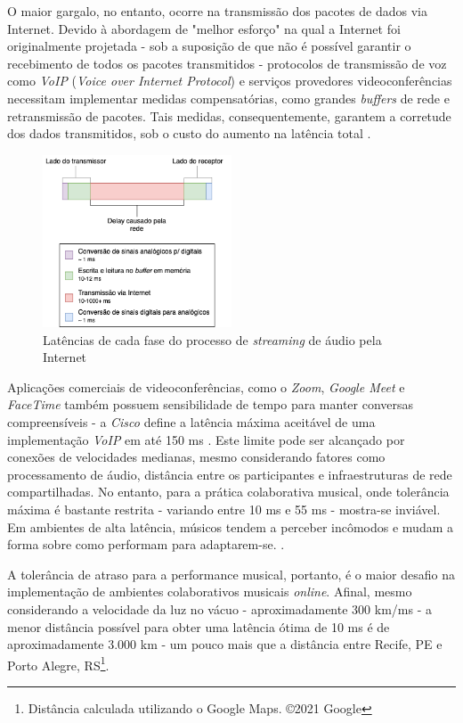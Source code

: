 O maior gargalo, no entanto, ocorre na transmissão dos pacotes de dados via Internet. Devido à abordagem de "melhor esforço" na qual a Internet foi originalmente projetada - sob a suposição de que não é possível garantir o recebimento de todos os pacotes transmitidos - protocolos de transmissão de voz como \textit{VoIP} (\textit{Voice over Internet Protocol}) e serviços provedores videoconferências necessitam implementar medidas compensatórias, como grandes \textit{buffers} de rede e retransmissão de pacotes. Tais medidas, consequentemente, garantem a corretude dos dados transmitidos, sob o custo do aumento na latência total \cite{carot_low_latency}.

\begin{figure}[htbp]
\centering
\includegraphics[width=0.5\textwidth]{images/streaming-latency.png}
\caption{Latências de cada fase do processo de \textit{streaming} de áudio pela Internet}
\label{fig:streaming_latencies}
\end{figure}

Aplicações comerciais de videoconferências, como o \textit{Zoom}, \textit{Google Meet} e \textit{FaceTime} também  possuem sensibilidade de tempo para manter conversas compreensíveis - a \textit{Cisco} define a latência máxima aceitável de uma implementação \textit{VoIP} em até 150 ms \cite{cisco}. Este limite pode ser alcançado por conexões de velocidades medianas, mesmo considerando fatores como processamento de áudio, distância entre os participantes e infraestruturas de rede compartilhadas. No entanto, para a prática colaborativa musical, onde tolerância máxima é bastante restrita - variando entre 10 ms e 55 ms \cite{mcphearson} - mostra-se inviável. Em ambientes de alta latência, músicos tendem a perceber incômodos e mudam a forma sobre como performam para adaptarem-se. \cite{carot_low_latency}.

A tolerância de atraso para a performance musical, portanto, é o maior desafio na implementação de ambientes colaborativos musicais \textit{online}. Afinal, mesmo considerando a velocidade da luz no vácuo - aproximadamente 300 km/ms \cite{speed_of_light} - a menor distância possível para obter uma latência ótima de 10 ms é de aproximadamente 3.000 km - um pouco mais que a distância entre Recife, PE e Porto Alegre, RS\footnote{Distância calculada utilizando o Google Maps. ©2021 Google}.

